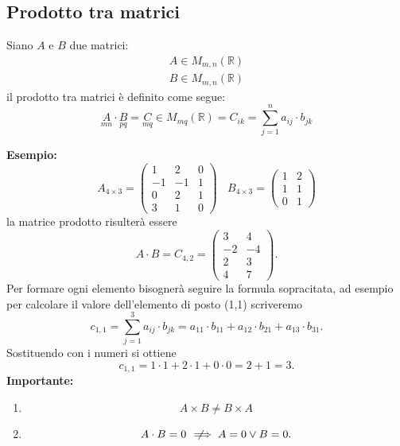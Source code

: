 \documentclass[a4paper]{article}
\newcommand{\nlongRightarrow}{\mkern12mu\not\mkern-10mu\implies}
\begin{document}
\subsection{Prodotto tra matrici}
Siano $A$ e $B$ due matrici:
\begin{equation*}
	\begin{array}{c}
		A \in M_{m,n} (\mathbb{R}) \\
		B \in M_{m,n} (\mathbb{R})
	\end{array}
\end{equation*}
il prodotto tra matrici è definito come segue:
\begin{equation*}
	\underset{mn}{A} \cdot \underset{pq}{B} = \underset{mq}{C} \in M_{mq} (\mathbb{R}) = C_{ik} = \sum_{j=1}^{n} a_{ij} \cdot b_{jk}
\end{equation*}

\textbf{Esempio: }
	\begin{equation*}
	A_{4\times 3}=
	\left(  
	\begin{array}{rrrr}
		1 & 2 & 0\\
		-1 & -1 & 1 \\
		0 & 2 & 1 \\
		3 & 1 & 0
	\end{array}\right)
	\ \ \ \
	B_{4\times 3}=
	\left(  
	\begin{array}{rrrr}
		1 & 2\\
		1 & 1 \\
		0 & 1
	\end{array}\right)
\end{equation*}
la matrice prodotto risulterà essere
\begin{equation*}
	A \cdot B = C_{4,2} =
	\begin{pmatrix}
		3 & 4\\
		-2 & -4\\
		2 & 3 \\
		4 & 7
	\end{pmatrix}.
\end{equation*}
Per formare ogni elemento bisognerà seguire la formula sopracitata, ad esempio per calcolare il valore dell'elemento di posto (1,1) scriveremo
\begin{equation*}
	c_{1,1} = \sum_{j=1}^{3} a_{ij} \cdot b_{jk} = a_{11} \cdot b_{11} + a_{12} \cdot b_{21} + a_{13} \cdot b_{31}.
\end{equation*}
Sostituendo con i numeri si ottiene
\begin{equation*}
	c_{1,1} = 1 \cdot 1 + 2 \cdot 1 + 0 \cdot 0 = 2+1=3.
\end{equation*}
\textbf{Importante: }
\begin{enumerate}
	\item \begin{equation*}
		A \times B \neq B \times A
	\end{equation*}
	
	\item \begin{equation*}
		A\cdot B=0 \nlongRightarrow A = 0 \lor B = 0.
	\end{equation*}
\end{enumerate}
\end{document}
